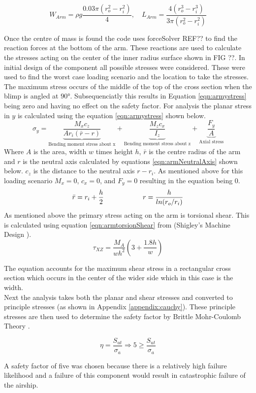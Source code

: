 \documentclass[../main.tex]{subfiles}
\begin{document}
\begin{equation} \label{eqn:armCg}
W_{Arm} = \rho g\frac{0.03\pi(r_o^2 - r_i^2)}{4}, \quad L_{Arm} =\frac{4(r_o^3 - r_i^3)}{3\pi(r_o^2 - r_i^2)}
\end{equation}

Once the centre of mass is found the code uses forceSolver REF?? to find the reaction forces at the bottom of the arm. These reactions are used to calculate the stresses acting on the center of the inner radius surface shown in FIG ??. In initial design of the component all possible stresses were considered. These were used to find the worst case loading scenario and the location to take the stresses. The maximum stress occurs of the middle of the top of the cross section when the blimp is angled at $90°$. Subsequenciatly this results in Equation \ref{eqn:armystress} being zero and having no effect on the safety factor. For analysis the planar stress in $y$ is calculated using the equation \ref{eqn:armystress} shown below. 
\begin{equation}
\label{eqn:armystress}
\sigma_{y}=  \underbrace{\frac{M_{x}c_z}{A r_i (\bar{r} - r)}}_\text{Bending moment stress about x} + \underbrace{\frac{M_{z}c_x}{I_z}}_\text{Bending moment stress about z} + \underbrace{\frac{F_y}{A}}_\text{Axial stress} 
\end{equation}
Where $A$ is the area, width $w$ times height $h$, $\bar{r}$ is the centre radius of the arm and $r$ is the neutral axis calculated by equations \ref{eqn:armNeutralAxis} shown below. $c_z$ is the distance to the neutral axis $r - r_i$. As mentioned above for this loading scenario $M_x = 0$, $c_x = 0$, and $F_y = 0$ resulting in the equation being 0.
\begin{equation} \label{eqn:armNeutralAxis}
\bar{r} = r_i + \frac{h}{2} \hspace{20mm}  r = \frac{h}{ln(r_o/r_i)}
\end{equation}
As mentioned above the primary stress acting on the arm is torsional shear. This is calculated using equation \ref{eqn:armtorsionShear} from {(Shigley's Machine Design \cite[102]{shigley})}. 
\begin{equation} \label{eqn:armtorsionShear}
\tau_{XZ} = \dfrac{M_{A}}{wh^2}(3+\frac{1.8h}{w})
\end{equation}

The equation accounts for the maximum shear stress in a rectangular cross section which occurs in the center of the wider side which in this case is the width. \\ 

Next the analysis takes both the planar and shear stresses and converted to principle stresses (as shown in Appendix \ref{appendix:cauchy}). These principle stresses are then used to determine the safety factor by Brittle Mohr-Coulomb Theory \cite[227]{shigley}.

\begin{equation}
\eta = \dfrac{S_{ut}}{\sigma _a} \Rightarrow 5 \geq \dfrac{S_{ut}}{\sigma _a}
\end{equation}

A safety factor of five was chosen because there is a relatively high failure likelihood and a failure of this component would result in catastrophic failure of the airship.
\end{document}

